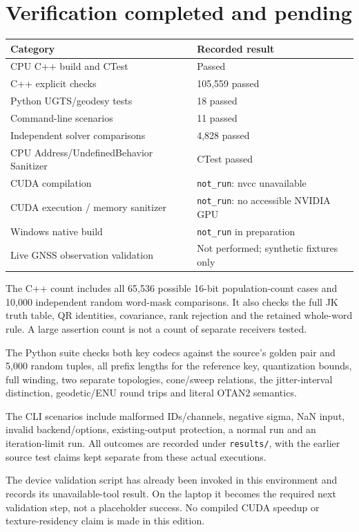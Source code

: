 \documentclass[11pt,a4paper]{article}
\newcommand{\code}[1]{\texttt{#1}}
\begin{document}
\section{Verification completed and pending}
\begin{center}
\begin{tabularx}{\textwidth}{@{}P{.48\textwidth}Y@{}}\toprule
\textbf{Category} & \textbf{Recorded result}\\\midrule
CPU C++ build and CTest & Passed\\
C++ explicit checks & 105,559 passed\\
Python UGTS/geodesy tests & 18 passed\\
Command-line scenarios & 11 passed\\
Independent solver comparisons & 4,828 passed\\
CPU Address/UndefinedBehavior Sanitizer & CTest passed\\
CUDA compilation & \code{not\_run}: nvcc unavailable\\
CUDA execution / memory sanitizer & \code{not\_run}: no accessible NVIDIA GPU\\
Windows native build & \code{not\_run} in preparation\\
Live GNSS observation validation & Not performed; synthetic fixtures only\\\bottomrule
\end{tabularx}
\end{center}

The C++ count includes all 65,536 possible 16-bit population-count cases and 10,000
independent random word-mask comparisons. It also checks the full JK truth table,
QR identities, covariance, rank rejection and the retained whole-word rule. A large
assertion count is not a count of separate receivers tested.

The Python suite checks both key codecs against the source's golden pair and 5,000
random tuples, all prefix lengths for the reference key, quantization bounds, full
winding, two separate topologies, cone/sweep relations, the jitter-interval distinction,
geodetic/ENU round trips and literal OTAN2 semantics.

The CLI scenarios include malformed IDs/channels, negative sigma, NaN input, invalid
backend/options, existing-output protection, a normal run and an iteration-limit run.
All outcomes are recorded under \code{results/}, with the earlier source test claims
kept separate from these actual executions.

The device validation script has already been invoked in this environment and records
its unavailable-tool result. On the laptop it becomes the required next validation step,
not a placeholder success. No compiled CUDA speedup or texture-residency claim is made
in this edition.
\clearpage
\end{document}
